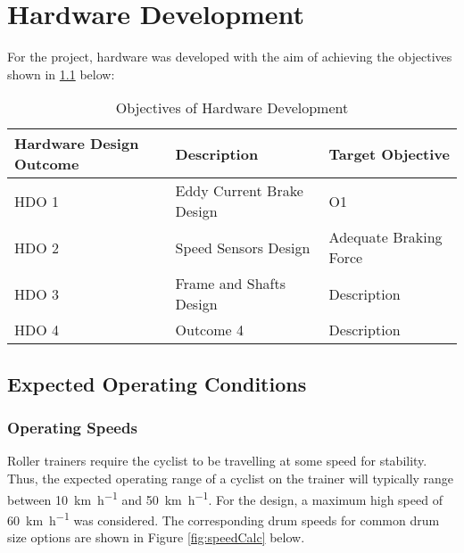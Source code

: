 
\chapter{Hardware Development}

For the project, hardware was developed with the aim of achieving the objectives shown in \ref{tab:devgoals} below:

\begin{table}[H]
	\renewcommand{\arraystretch}{\tablestretch}
	\centering
	\caption{Objectives of Hardware Development}
	\begin{tabularx}{\textwidth}{p{3.2cm} >{\raggedright}p{5cm} >{\raggedright\arraybackslash}X}
		\toprule
		Hardware Design Outcome & Description               & Target Objective       \\
		\midrule
		HDO 1                   & Eddy Current Brake Design & O1                     \\
		HDO 2                   & Speed Sensors Design      & Adequate Braking Force \\
		HDO 3                   & Frame and Shafts Design   & Description            \\
		HDO 4                   & Outcome 4                 & Description            \\
		\bottomrule
	\end{tabularx}
	\label{tab:devgoals}
\end{table}

\newpage

\section{Expected Operating Conditions}

\subsection{Operating Speeds}
\label{sec:opspeed}

Roller trainers require the cyclist to be travelling at some speed for stability. Thus, the expected operating range of a cyclist on the trainer will typically range between \SI{10}{\kilo\meter\per\hour} and \SI{50}{\kilo\meter\per\hour}. For the design, a maximum high speed of \SI{60}{\kilo\meter\per\hour} was considered. The corresponding drum speeds for common drum size options are shown in Figure \ref{fig:speedCalc} below.

